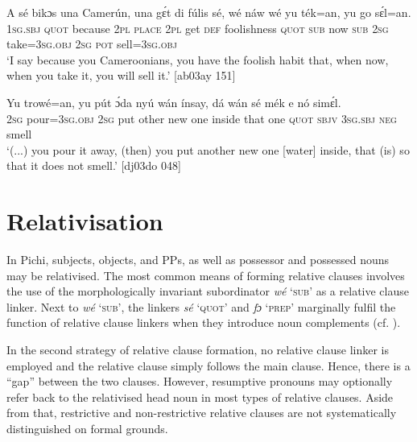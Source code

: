 \ea%
    \label{ex:key:1418}
    \gll A    sé    bikɔs  una  Camerún,  una  gɛ́t  di  fúlis      sé,
wé  náw    wé  yu  ték=an,    yu  go  sɛ́l=an.\\
\textsc{1sg.sbj}  \textsc{quot}    because  \textsc{2pl}  \textsc{place}    \textsc{2pl}  get  \textsc{def}  foolishness  \textsc{quot}
\textsc{sub}  now    \textsc{sub}  \textsc{2sg}  take=\textsc{3sg.obj}  \textsc{2sg}  \textsc{pot}  sell=\textsc{3sg.obj}\\

\glt ‘I say because you Cameroonians, you have the foolish habit that, when now, 
when you take it, you will sell it.’ [ab03ay 151]
\z


\ea%
    \label{ex:key:1419}
    \gll Yu  trowé=an,  yu  pút  ɔ́da    nyú  wán    ínsay,
dá  wán    sé    mék    e    nó  simɛ́l.\\
\textsc{2sg}  pour=\textsc{3sg.obj}  \textsc{2sg}  put  other  new  one    inside
that  one    \textsc{quot}    \textsc{sbjv}    \textsc{3sg.sbj}  \textsc{neg}  smell\\

\glt ‘(...) you pour it away, (then) you put another new one [water] inside, 
that (is) so that it does not smell.’ [dj03do 048]
\z

\section{Relativisation}\label{sec:10.6}

In Pichi, subjects, objects, and PPs, as well as possessor and possessed nouns may be relativised. The most common means of forming relative clauses involves the use of the morphologically invariant subordinator \textit{wé} ‘\textsc{sub}’ as a relative clause linker. Next to \textit{wé} ‘\textsc{sub}’, the linkers \textit{sé} ‘\textsc{quot}’ and \textit{fɔ} ‘\textsc{prep}’ marginally fulfil the function of relative clause linkers when they introduce noun complements (cf. ).


In the second strategy of relative clause formation, no relative clause linker is employed and the relative clause simply follows the main clause. Hence, there is a “gap” between the two clauses. However, resumptive pronouns may optionally refer back to the relativised head noun in most types of relative clauses. Aside from that, restrictive and non-restrictive relative clauses are not systematically distinguished on formal grounds. 



